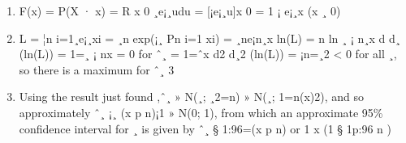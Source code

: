 \documentclass[a4paper,12pt]{article}
\begin{document}
\begin{enumerate}
    \item F(x) = P(X · x) =
R x
0 ¸e¡¸udu = [¡e¡¸u]x
0 = 1 ¡ e¡¸x (x ¸ 0)

\item  L = ¦n i=1¸e¡¸xi = ¸n exp(¡¸
Pn
i=1
xi) = ¸ne¡n¸x ln(L) = n ln ¸ ¡ n¸x
d
d¸ (ln(L)) = 1=¸ ¡ nx = 0 for ˆ¸ = 1=ˆx d2
d¸2 (ln(L)) = ¡n=¸2 < 0 for all ¸, so there is a
maximum for ˆ¸
3
\item  Using the result just found ,ˆ¸ » N(¸; ¸2=n) » N(¸; 1=n(x)2), and so approximately
ˆ¸
¡¸
(x
p
n)¡1 » N(0; 1), from which an approximate 95\% confidence interval for ¸ is given by
ˆ¸
§ 1:96=(x
p
n) or 1
x (1 § 1p:96
n )
\end{enumerate}
\end{document}
